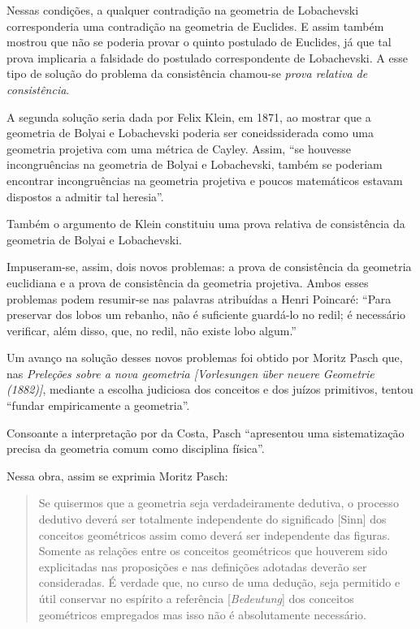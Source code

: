 \documentclass{hipatia}
\begin{document}
Nessas condições, a qualquer contradição na geometria de Lobachevski corresponderia uma contradição na geometria de Euclides. E assim também mostrou que não se poderia provar o quinto postulado de Euclides, já que tal prova implicaria a falsidade do postulado correspondente de Lobachevski. A esse tipo de solução do problema da consistência chamou-se \emph{prova relativa de consistência}.  \cite[p. 388]{kneale}\cite[p. 325]{fraenkel1963}

A segunda solução seria dada por Felix Klein, em 1871, ao  mostrar que a geometria de Bolyai e Lobachevski poderia ser coneidssiderada como uma geometria projetiva com uma métrica de Cayley. Assim, ``se houvesse incongruências na geometria de Bolyai e Lobachevski, também se poderiam encontrar incongruências na geometria projetiva e poucos matemáticos estavam dispostos a admitir tal heresia''. \cite[p. 178]{struik1987}  

Também o argumento de Klein constituiu uma prova relativa de consistência da geometria de Bolyai e Lobachevski.

Impuseram-se, assim, dois novos problemas: a prova de consistência da geometria euclidiana e a prova de consistência da geometria projetiva. Ambos esses problemas podem resumir-se nas palavras atribuídas a Henri Poincaré: ``Para preservar dos lobos um rebanho, não é suficiente guardá-lo no redil; é necessário verificar, além disso, que, no redil, não existe lobo algum.''  \cite[p. 59]{babini1974}

Um avanço na solução desses novos problemas foi obtido por Moritz Pasch que, nas \emph{Preleções sobre a nova geometria [Vorlesungen über neuere Geometrie (1882)]}, mediante a escolha judiciosa dos conceitos e dos juízos primitivos, tentou ``fundar empiricamente a geometria''. \cite[p. 151]{pasch1924} 

Consoante a interpretação por da Costa, Pasch ``apresentou uma sistematização precisa da geometria comum como disciplina física''.  \cite[p. 193]{costa1994}

Nessa obra, assim se exprimia Moritz Pasch: 
\begin{quote}   
Se quisermos que a geometria seja verdadeiramente dedutiva, o processo dedutivo deverá ser totalmente independente do significado [Sinn] dos conceitos geométricos assim como deverá ser independente das figuras. Somente as relações entre os conceitos geométricos que houverem sido explicitadas nas proposições e nas definições adotadas deverão ser consideradas. É verdade que, no curso de uma dedução, seja permitido e útil conservar no espírito a referência [\emph{Bedeutung}] dos conceitos geométricos empregados mas isso não é absolutamente necessário.  
\cite[\emph{apud}, p. 283]{bottazzini2001}\cite[\emph{apud}, p. 654]{gandon2005}
\end{quote}
\end{document}

